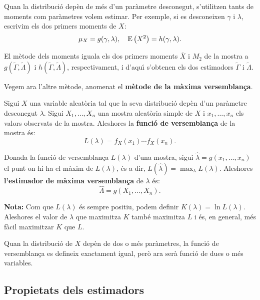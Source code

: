 Quan la distribuci\'o dep\`en de m\'es d'un par\`ametre desconegut, 
s'utilitzen tants de moments com par\`ametres volem estimar. Per exemple, 
si es desconeixen $\gamma$ i $\lambda$, escrivim els dos primers moments de $X$:
$$\mu_X = g(\gamma,\lambda), \ \ \ \EE\left(X^2\right) = h(\gamma,\lambda).$$

El m\`etode dels moments iguala els dos primers moments $\bar{X}$ i $M_2$ de 
la mostra a $g(\tilde{\Gamma},\tilde{\Lambda})$ i
$h(\tilde{\Gamma},\tilde{\Lambda})$, respectivament, i d'aqu\'{\i} s'obtenen els dos
estimadors $\tilde{\Gamma}$ i $\tilde{\Lambda}$.

Vegem ara l'altre m\`etode, anomenat el 
{\bf m\`etode de la m\`axima versemblan\c ca}.

\begin{defin}
Sigui $X$ una variable aleat\`oria tal que la seva distribuci\'o dep\`en d'un
par\`ametre desconegut $\lambda$. 
Sigui $X_1, \ldots , X_n$ una mostra aleat\`oria
simple de $X$ i $x_1, \ldots , x_n$ els valors observats de la mostra.
Aleshores la {\bf funci\'o de versemblan\c{c}a} 
de la mostra \'es:
$$L(\lambda) = f_X(x_1) \cdots f_X(x_n).$$
\end{defin}

\begin{defin}
Donada la funci\'o de versemblan\c ca $L(\lambda)$ d'una mostra, sigui
\break $\hat{\lambda} = g(x_1, \ldots , x_n)$ el punt on hi ha el m\`axim de
$L(\lambda)$, \'es a dir, $\displaystyle L(\hat{\lambda}) = \max_\lambda
L(\lambda)$. Aleshores {\bf l'estimador de m\`axima versemblan\c{c}a}
de $\lambda$ \'es:
$$\hat{\Lambda} = g(X_1, \ldots , X_n).$$
\end{defin}

{\bf Nota:} Com que $L(\lambda)$ \'es sempre positiu, 
podem definir $K(\lambda) = \ln L(\lambda)$. 
Aleshores el valor de $\lambda$ que maximitza $K$ tamb\'e
maximitza $L$ i \'es, en general, m\'es f\`acil maximitzar $K$ que $L$.

Quan la distribuci\'o de $X$ dep\`en de dos o m\'es par\`ametres, la funci\'o de
versemblan\c ca es defineix exactament igual, per\`o ara ser\`a funci\'o de dues o m\'es
variables.

\subsection{Propietats dels estimadors}

